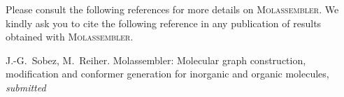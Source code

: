 \documentclass[]{tufte-book}
\begin{document}
Please consult the following references for more details on
\textsc{Molassembler}. We kindly ask you to cite the following reference in any
publication of results obtained with \textsc{Molassembler}.

\vspace{1cm}


J.-G.~Sobez, M.~Reiher. Molassembler: Molecular graph construction, modification
and conformer generation for inorganic and organic molecules, \textit{submitted}




\backmatter




\end{document}
